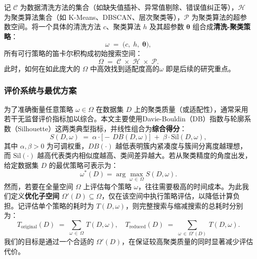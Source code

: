\documentclass[10pt]{article} %
\numberwithin{equation}{section}
\begin{document}
记 \(\mathcal{C}\) 为数据清洗方法的集合（如缺失值插补、异常值剔除、错误值纠正等），\(\mathcal{H}\) 为聚类算法集合（如 K-Means、DBSCAN、层次聚类等），\(\mathcal{P}\) 为聚类算法的超参数空间。将一个具体的清洗方法 \(c\)、聚类算法 \(h\) 及其超参数 \(\boldsymbol{\theta}\) 组合成\textbf{清洗-聚类策略}：
\begin{equation}\label{eq:omega}
  \omega 
  \;=\; 
  \bigl(c,\; h,\; \boldsymbol{\theta}\bigr),
\end{equation}
所有可行策略的笛卡尔积构成初始搜索空间：
\begin{equation}\label{eq:Omega}
  \Omega 
  \;=\; 
  \mathcal{C} \;\times\; \mathcal{H} \;\times\; \mathcal{P}.
\end{equation}
此时，如何在如此庞大的 \(\Omega\) 中高效找到适配度高的\(\omega\) 即是后续的研究重点。

\subsubsection{评价系统与最优方案}
为了准确衡量任意策略 \(\omega \in \Omega\) 在数据集 \(D\) 上的聚类质量（或适配性），通常采用若干无监督评价指标加以综合。本文主要使用Davie-Bouldin（DB）指数\cite{4766909}与轮廓系数（Silhouette）\cite{ROUSSEEUW198753}这两类典型指标，并线性组合为\textbf{综合得分}：
\begin{equation}\label{eq:S-score}
  S(D,\omega)
  \;=\;
  \alpha \cdot \bigl[-\,DB(D,\omega)\bigr]
  \;+\;
  \beta \cdot \mathrm{Sil}(D,\omega),
\end{equation}
其中 \(\alpha,\beta > 0\) 为可调权重，\(DB(\cdot)\) 越低表明簇内紧凑度与簇间分离度越理想，而 \(\mathrm{Sil}(\cdot)\) 越高代表类内相似度越高、类间差异越大。若从聚类精度的角度出发，给定数据集 \(D\) 的最优策略可表示为：
\begin{equation}\label{eq:best strategy}
  \omega^*(D)
  = \arg\max_{\omega \,\in\, \Omega} S(D,\omega).
\end{equation}
然而，若要在全量空间 \(\Omega\) 上评估每个策略 \(\omega\)，往往需要极高的时间成本。为此我们定义\textbf{优化子空间} \(\Omega'(D)\subseteq \Omega\)，仅在该空间中执行策略评估，以降低计算负担。记评估单个策略的耗时为 \(T(D,\omega)\)，则完整搜索与缩减搜索的总耗时分别为：
\begin{equation}\label{eq:T-original}
  T_{\text{original}}(D)
  \;=\;
  \sum_{\omega \,\in\, \Omega} \, T(D,\omega),
\quad
  T_{\text{reduced}}(D)
  \;=\;
  \sum_{\omega \,\in\, \Omega'(D)} \, T(D,\omega).
\end{equation}
我们的目标是通过一个合适的 \(\Omega'(D)\)，在保证较高聚类质量的同时显著减少评估代价。
\end{document}
